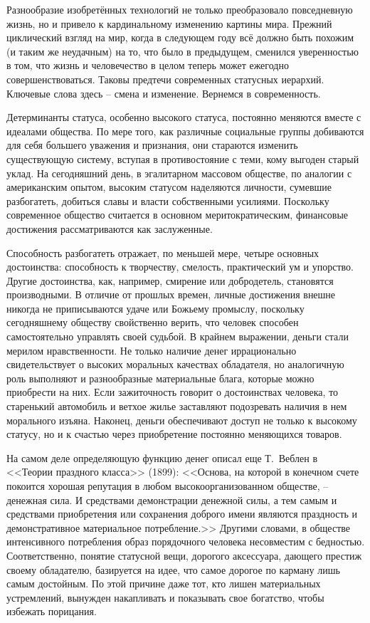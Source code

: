 Разнообразие изобретённых технологий не только преобразовало повседневную жизнь,
но и привело к кардинальному изменению картины мира. Прежний циклический взгляд
на мир, когда в следующем году всё должно быть похожим (и таким же неудачным)
на то, что было в предыдущем, сменился уверенностью в том, что жизнь и
человечество в целом теперь может ежегодно совершенствоваться. Таковы предтечи
современных статусных иерархий. Ключевые слова здесь -- смена и изменение.
Вернемся в современность.

Детерминанты статуса, особенно высокого статуса, постоянно меняются вместе с
идеалами общества. По мере того, как различные социальные группы добиваются для
себя большего уважения и признания, они стараются изменить существующую систему,
вступая в противостояние с теми, кому выгоден старый уклад. На сегодняшний день,
в эгалитарном массовом обществе, по аналогии с американским опытом, высоким
статусом  наделяются личности, сумевшие разбогатеть, добиться славы и власти
собственными усилиями. Поскольку современное общество считается в основном
меритократическим, финансовые достижения рассматриваются как заслуженные.

Способность разбогатеть отражает, по меньшей мере, четыре основных достоинства:
способность к творчеству, смелость, практический ум и упорство. Другие
достоинства, как, например, смирение или добродетель, становятся производными.
В отличие от прошлых времен, личные достижения внешне никогда не приписываются
удаче или Божьему промыслу, поскольку сегодняшнему обществу свойственно верить,
что человек способен самостоятельно управлять своей судьбой. В крайнем выражении,
деньги стали мерилом нравственности. Не только наличие денег иррационально
свидетельствует о высоких моральных качествах обладателя, но аналогичную роль
выполняют и разнообразные материальные блага, которые можно приобрести на них.
Если зажиточность говорит о достоинствах человека, то старенький автомобиль и
ветхое жилье заставляют подозревать наличия в нем морального изъяна. Наконец,
деньги обеспечивают доступ не только к высокому статусу, но и к счастью через
приобретение постоянно меняющихся товаров.

На самом деле определяющую функцию денег описал еще Т.~Веблен в <<Теории
праздного класса>> (1899): <<Основа, на которой в конечном счете покоится
хорошая репутация в любом высокоорганизованном обществе, -- денежная сила.
И средствами демонстрации денежной силы, а тем самым и средствами приобретения
или сохранения доброго имени являются праздность и демонстративное материальное
потребление.>>\autocite[][120]{veblen1984teoria} Другими словами, в обществе
интенсивного потребления образ порядочного человека несовместим с бедностью.
Соответственно, понятие статусной вещи, дорогого аксессуара, дающего престиж
своему обладателю, базируется на идее, что самое дорогое по карману лишь самым
достойным. По этой причине даже тот, кто лишен материальных устремлений, вынужден
накапливать и показывать свое богатство, чтобы избежать порицания.

